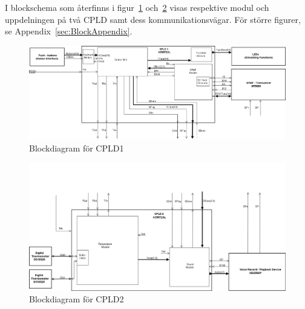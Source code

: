 \documentclass[a4paper,11pt]{article}
\begin{document}
	I blockschema som återfinns i figur~\ref{fig:blocks1} och~\ref{fig:blocks2} visas respektive modul och uppdelningen på två CPLD samt dess kommunikationsvägar. För större figurer, se Appendix~\ref{sec:BlockAppendix}.\\

	\begin{figure} [H]
		  	
			\centering
			\includegraphics[width=1\textwidth, height = 0.40\textwidth]{BlockDiagramCPLD1.png}
		  	\caption{Blockdiagram för CPLD1}
			\label{fig:blocks1}
	\end{figure}

	\begin{figure}[H]
		  	
			\centering
			\includegraphics[width=1\textwidth, height = 0.40\textwidth]{BlockDiagramCPLD2.png}
			\caption{Blockdiagram för CPLD2}
			\label{fig:blocks2}
	\end{figure}
\end{document}
